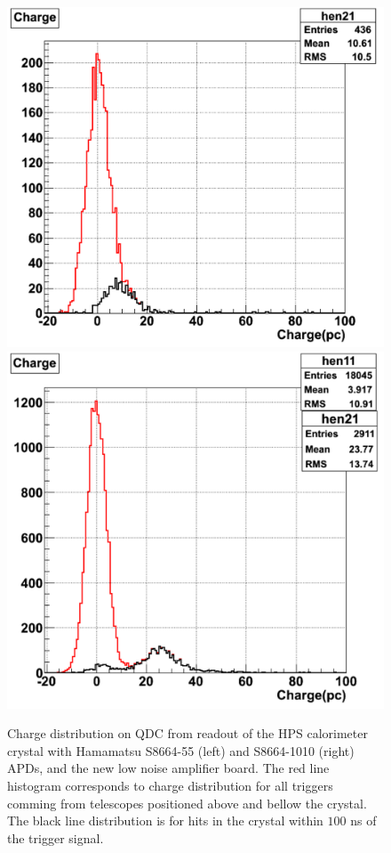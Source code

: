 \begin{figure}[t]
\includegraphics[scale=0.37]{ecal/MIP_5x5_APD.png}
\includegraphics[scale=0.37]{ecal/MIP_10x10_APD.png}
\caption{\small{Charge distribution on QDC from readout of the HPS calorimeter crystal with Hamamatsu S8664-55 (left) and S8664-1010 (right) APDs, and the new low noise amplifier board. The red line histogram corresponds to charge distribution for all triggers comming from telescopes positioned above and bellow the crystal. The black line distribution is for hits in the crystal within $100$ ns of the trigger signal. }}\label{fig:mip10x10}
\end{figure}

